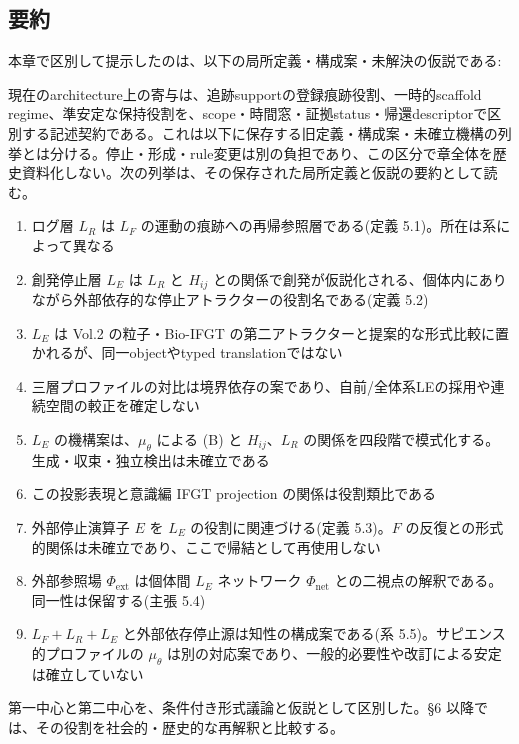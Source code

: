 \bigskip


\subsection{要約}


本章で区別して提示したのは、以下の局所定義・構成案・未解決の仮説である:

現在のarchitecture上の寄与は、追跡supportの登録痕跡役割、一時的scaffold regime、準安定な保持役割を、scope・時間窓・証拠status・帰還descriptorで区別する記述契約である。これは以下に保存する旧定義・構成案・未確立機構の列挙とは分ける。停止・形成・rule変更は別の負担であり、この区分で章全体を歴史資料化しない。次の列挙は、その保存された局所定義と仮説の要約として読む。

\begin{enumerate}
\item ログ層 $L_R$ は $L_F$ の運動の痕跡への再帰参照層である(定義 5.1)。所在は系によって異なる
\item 創発停止層 $L_E$ は $L_R$ と $H_{ij}$ との関係で創発が仮説化される、個体内にありながら外部依存的な停止アトラクターの役割名である(定義 5.2)
\item $L_E$ は Vol.2 の粒子・Bio-IFGT の第二アトラクターと提案的な形式比較に置かれるが、同一objectやtyped translationではない
\item 三層プロファイルの対比は境界依存の案であり、自前/全体系LEの採用や連続空間の較正を確定しない
\item $L_E$ の機構案は、$\mu_\theta$ による (B) と $H_{ij}$、$L_R$ の関係を四段階で模式化する。生成・収束・独立検出は未確立である
\item この投影表現と意識編 IFGT projection の関係は役割類比である
\item 外部停止演算子 $E$ を $L_E$ の役割に関連づける(定義 5.3)。$F$ の反復との形式的関係は未確立であり、ここで帰結として再使用しない
\item 外部参照場 $\Phi_{\text{ext}}$ は個体間 $L_E$ ネットワーク $\Phi_{\text{net}}$ との二視点の解釈である。同一性は保留する(主張 5.4)
\item $L_F + L_R + L_E$ と外部依存停止源は知性の構成案である(系 5.5)。サピエンス的プロファイルの $\mu_\theta$ は別の対応案であり、一般的必要性や改訂による安定は確立していない
\end{enumerate}


第一中心と第二中心を、条件付き形式議論と仮説として区別した。\S{}6 以降では、その役割を社会的・歴史的な再解釈と比較する。

\bigskip
